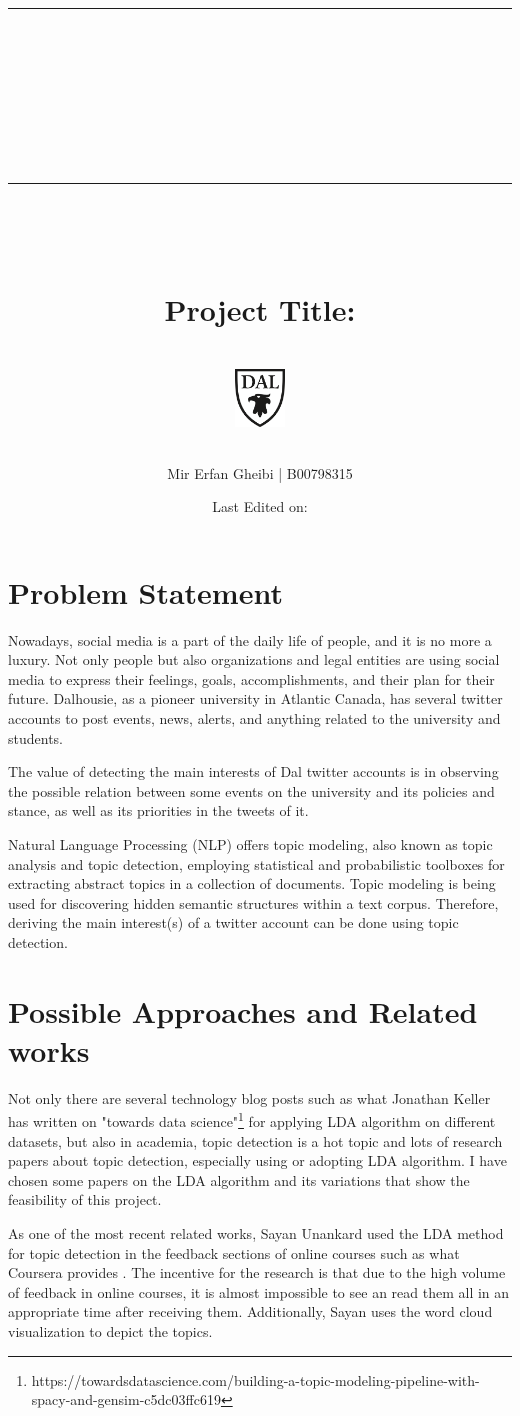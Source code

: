 \documentclass[11pt,titlepage]{article}
\title{\normalsize\rule{\textwidth}{0.1cm}\\ [0.5cm]
		\LARGE \textbf{\course}\\\reportname
		\\[0.5cm]\rule{\textwidth}{0.1cm}~\\[0.5cm]
		~
		\\\textbf{Project Title: }
		\\\prtitle
		\\ [0.5cm]
		\normalsize \vspace*{5\baselineskip}
		\includegraphics[width=0.1\textwidth]{dal_logo.png}\\[1cm]
		\author{Mir Erfan Gheibi | B00798315}
		\date{Last Edited on: \laseditdate}
		}
\begin{document}
\maketitle
\newpage

\section{Problem Statement}
Nowadays, social media is a part of the daily life of people, and it is no more a luxury. Not only people but also organizations and legal entities are using social media to express their feelings, goals, accomplishments, and their plan for their future. Dalhousie, as a pioneer university in Atlantic Canada, has several twitter accounts to post events, news, alerts, and anything related to the university and students. 

 The value of detecting the main interests of Dal twitter accounts is in observing the possible relation between some events on the university and its policies and stance, as well as its priorities in the tweets of it. 

Natural Language Processing (NLP) offers topic modeling, also known as topic analysis and topic detection, employing statistical and probabilistic toolboxes for extracting abstract topics in a collection of documents. Topic modeling is being used for discovering hidden semantic structures within a text corpus. Therefore, deriving the main interest(s) of a twitter account can be done using topic detection. 

\section{Possible Approaches and Related works}
Not only there are several technology blog posts such as what Jonathan Keller has written on "towards data science"\footnote{https://towardsdatascience.com/building-a-topic-modeling-pipeline-with-spacy-and-gensim-c5dc03ffc619} for applying LDA algorithm on different datasets, but also in academia, topic detection is a hot topic and lots of research papers about topic detection, especially using or adopting LDA algorithm. I have chosen some papers on the LDA algorithm and its variations that show the feasibility of this project.


As one of the most recent related works, Sayan Unankard used the LDA method for topic detection in the feedback sections of online courses such as what Coursera provides \cite{unankard2019topic}. The incentive for the research is that due to the high volume of feedback in online courses, it is almost impossible to see an read them all in an appropriate time after receiving them. Additionally, Sayan uses the word cloud visualization to depict the topics.
\end{document}
